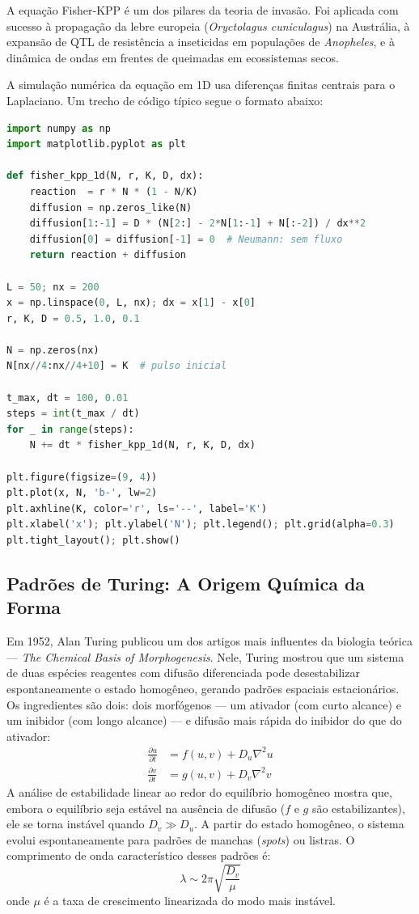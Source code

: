 A equação Fisher-KPP é um dos pilares da teoria de invasão. Foi aplicada
com sucesso à propagação da lebre europeia (\textit{Oryctolagus
cuniculagus}) na Austrália, à expansão de QTL de resistência a inseticidas
em populações de \textit{Anopheles}, e à dinâmica de ondas em frentes de
queimadas em ecossistemas secos.

A simulação numérica da equação em 1D usa diferenças finitas centrais para o
Laplaciano. Um trecho de código típico segue o formato abaixo:

\begin{lstlisting}[language=Python, caption=Equacao de Fisher-KPP em 1D]
import numpy as np
import matplotlib.pyplot as plt

def fisher_kpp_1d(N, r, K, D, dx):
    reaction  = r * N * (1 - N/K)
    diffusion = np.zeros_like(N)
    diffusion[1:-1] = D * (N[2:] - 2*N[1:-1] + N[:-2]) / dx**2
    diffusion[0] = diffusion[-1] = 0  # Neumann: sem fluxo
    return reaction + diffusion

L = 50; nx = 200
x = np.linspace(0, L, nx); dx = x[1] - x[0]
r, K, D = 0.5, 1.0, 0.1

N = np.zeros(nx)
N[nx//4:nx//4+10] = K  # pulso inicial

t_max, dt = 100, 0.01
steps = int(t_max / dt)
for _ in range(steps):
    N += dt * fisher_kpp_1d(N, r, K, D, dx)

plt.figure(figsize=(9, 4))
plt.plot(x, N, 'b-', lw=2)
plt.axhline(K, color='r', ls='--', label='K')
plt.xlabel('x'); plt.ylabel('N'); plt.legend(); plt.grid(alpha=0.3)
plt.tight_layout(); plt.show()
\end{lstlisting}

\subsection{Padrões de Turing: A Origem Química da Forma}
\label{sub:image10-turing}

Em 1952, Alan Turing publicou um dos artigos mais influentes da biologia
teórica --- \emph{The Chemical Basis of Morphogenesis}. Nele, Turing mostrou
que um sistema de duas espécies reagentes com difusão diferenciada pode
desestabilizar espontaneamente o estado homogêneo, gerando padrões espaciais
estacionários. Os ingredientes são dois: dois morfógenos --- um ativador (com
curto alcance) e um inibidor (com longo alcance) --- e difusão mais rápida do
inibidor do que do ativador:
\begin{align}
\frac{\partial u}{\partial t} &= f(u, v) + D_u \nabla^2 u \\
\frac{\partial v}{\partial t} &= g(u, v) + D_v \nabla^2 v
\end{align}
A análise de estabilidade linear ao redor do equilíbrio homogêneo mostra que,
embora o equilíbrio seja estável na ausência de difusão ($f$ e $g$ são
estabilizantes), ele se torna instável quando $D_v \gg D_u$. A partir do
estado homogêneo, o sistema evolui espontaneamente para padrões de manchas
(\emph{spots}) ou listras. O comprimento de onda característico desses
padrões é:
\begin{equation}
\lambda \sim 2\pi \sqrt{\frac{D_v}{\mu}}
\end{equation}
onde $\mu$ é a taxa de crescimento linearizada do modo mais instável.

